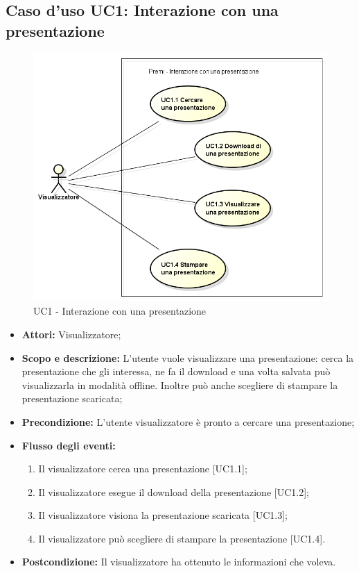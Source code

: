 \subsection{Caso d'uso UC1: Interazione con una presentazione}
\begin{figure}[h] 
	\centering 
	\includegraphics[scale=0.45] {img/UC1.png} 
	\caption{UC1 - Interazione con una presentazione} 
\end{figure}

\begin{itemize}
	\item \textbf{Attori:} Visualizzatore;
	\item \textbf{Scopo e descrizione:} L'utente vuole visualizzare una presentazione: cerca la presentazione che gli interessa, ne fa il download e una volta salvata può visualizzarla in modalità offline. Inoltre può anche scegliere di stampare la presentazione scaricata;
	\item \textbf{Precondizione:} L'utente visualizzatore è pronto a cercare una presentazione;
	\item \textbf{Flusso degli eventi:}
	\begin{enumerate}
		\item Il visualizzatore cerca una presentazione [UC1.1];
		\item Il visualizzatore esegue il download della presentazione [UC1.2];
		\item Il visualizzatore visiona la presentazione scaricata [UC1.3];
		\item Il visualizzatore può scegliere di stampare la presentazione [UC1.4].
	\end{enumerate}
	\item \textbf{Postcondizione:} Il visualizzatore ha ottenuto le informazioni che voleva.
\end{itemize}

